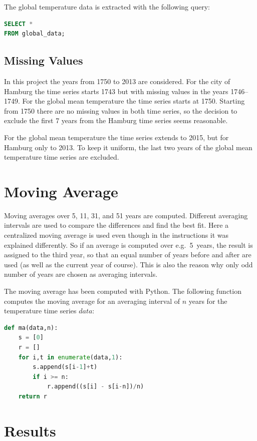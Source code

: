 \documentclass[a4paper]{scrartcl}
\begin{document}
The global temperature data is extracted with the following query:
\begin{lstlisting}[language=sql]
SELECT *
FROM global_data;
\end{lstlisting}

\subsection{Missing Values}
In this project the years from 1750 to 2013 are considered. 
For the city of Hamburg the time series starts 1743 but with missing values in the years 1746--1749. 
For the global mean temperature the time series starts at 1750. 
Starting from 1750 there are no missing values in both time series, so the decision to exclude the first 7 years from the Hamburg time series seems reasonable. 

For the global mean temperature the time series extends to 2015, but for Hamburg only to 2013. 
To keep it uniform, the last two years of the global mean temperature time series are excluded. 


\section{Moving Average}
Moving averages over 5, 11, 31, and 51 years are computed. 
Different averaging intervals are used to compare the differences and find the best fit. 
Here a centralized moving average is used even though in the instructions it was explained differently. 
So if an average is computed over e.g.\ 5~years, the result is assigned to the third year, so that an equal number of years before and after are used (as well as the current year of course). 
This is also the reason why only odd number of years are chosen as averaging intervals. 

The moving average has been computed with Python. 
The following function computes the moving average for an averaging interval of $n$ years for the temperature time series $data$:
\begin{lstlisting}[language=python]
 def ma(data,n):
    s = [0]
    r = []
    for i,t in enumerate(data,1):
        s.append(s[i-1]+t)
        if i >= n:
            r.append((s[i] - s[i-n])/n)
    return r

\end{lstlisting}


\section{Results}
\end{document}
